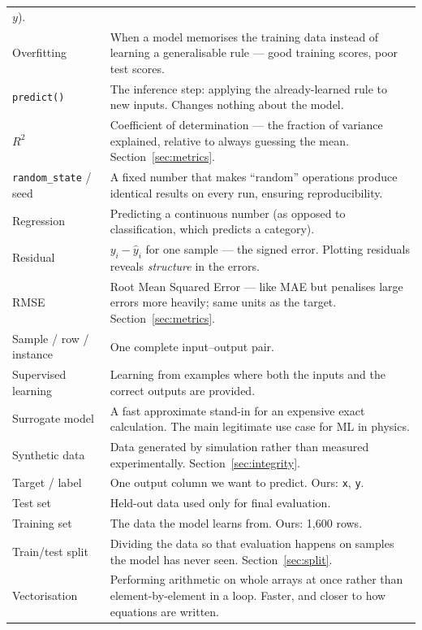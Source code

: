 \documentclass[11pt,a4paper]{article}
\newcommand{\Rsq}{R^{2}}
\begin{document}
\begin{longtable}{@{}p{3.3cm}p{11.5cm}@{}}
  $y$). \\
Overfitting & When a model memorises the training data instead of learning a generalisable rule ---
  good training scores, poor test scores. \\
\texttt{predict()} & The inference step: applying the already-learned rule to new inputs. Changes
  nothing about the model. \\
$\Rsq$ & Coefficient of determination --- the fraction of variance explained, relative to always
  guessing the mean. Section~\ref{sec:metrics}. \\
\texttt{random\_state} / seed & A fixed number that makes ``random'' operations produce identical
  results on every run, ensuring reproducibility. \\
Regression & Predicting a continuous number (as opposed to classification, which predicts a
  category). \\
Residual & $y_i-\hat{y}_i$ for one sample --- the signed error. Plotting residuals reveals
  \emph{structure} in the errors. \\
RMSE & Root Mean Squared Error --- like MAE but penalises large errors more heavily; same units as
  the target. Section~\ref{sec:metrics}. \\
Sample / row / instance & One complete input--output pair. \\
Supervised learning & Learning from examples where both the inputs and the correct outputs are
  provided. \\
Surrogate model & A fast approximate stand-in for an expensive exact calculation. The main
  legitimate use case for ML in physics. \\
Synthetic data & Data generated by simulation rather than measured experimentally.
  Section~\ref{sec:integrity}. \\
Target / label & One output column we want to predict. Ours: \texttt{x}, \texttt{y}. \\
Test set & Held-out data used only for final evaluation. \\
Training set & The data the model learns from. Ours: 1{,}600 rows. \\
Train/test split & Dividing the data so that evaluation happens on samples the model has never seen.
  Section~\ref{sec:split}. \\
Vectorisation & Performing arithmetic on whole arrays at once rather than element-by-element in a
  loop. Faster, and closer to how equations are written. \\
\end{longtable}
\end{document}
